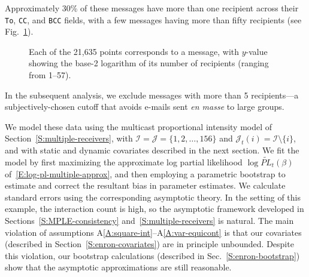 \documentclass[final]{statsoc}
\begin{document}
Approximately 30\% of these messages have more than one recipient across
their \texttt{To}, \texttt{CC}, and \texttt{BCC} fields, with a few
messages having more than fifty recipients
(see Fig.~\ref{F:recipient-counts}).
\begin{figure}
    \centering
    \caption{
        Each of the 21,635 points corresponds to a message, with
        $y$-value showing the base-2 logarithm of its number of recipients
        (ranging from 1--57).
    }\label{F:recipient-counts}
\end{figure}
In the subsequent analysis, we exclude messages with more than 5
recipients---a subjectively-chosen cutoff that avoids e-mails sent
\emph{en masse} to large groups.

We model these data using the multicast proportional intensity
model of Section~\ref{S:multiple-receivers}, with
$\mathcal{I} = \mathcal{J} = \{ 1, 2, \ldots, 156 \}$ and
$\mathcal{J}_t(i) = \mathcal{I} \setminus \{ i \}$, and with static and
dynamic covariates described in the next section.
We fit the model by first maximizing the approximate log partial
likelihood $\log \widetilde{\mathit{PL}}_t(\beta)$ of~\eqref{E:log-pl-multiple-approx}, and then employing a
parametric bootstrap to estimate and correct the resultant bias in
parameter estimates.  We calculate standard errors using the
corresponding asymptotic theory.
In the setting of this example, the interaction count is high, so
the asymptotic framework developed in Sections~\ref{S:MPLE-consistency}
and~\ref{S:multiple-receivers} is natural.  The main violation of assumptions
A\ref{A:square-int}--A\ref{A:var-equicont} is that our covariates (described in Section~\ref{S:enron-covariates}) are
in principle unbounded.  Despite this violation, our bootstrap calculations
(described in Sec.~\ref{S:enron-bootstrap}) show that the asymptotic approximations are still
reasonable. 
\end{document}
